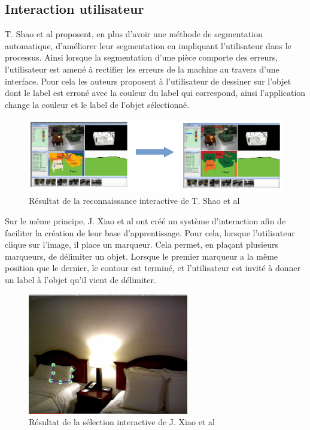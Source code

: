 \subsection{Interaction utilisateur}
T. Shao et al\cite{interactiveSeg} proposent, en plus d'avoir une méthode de segmentation automatique, d'améliorer leur 
segmentation en impliquant l'utilisateur dans le processus. Ainsi lorsque la segmentation d'une pièce comporte des erreurs, 
l'utilisateur est amené à rectifier les erreurs de la machine au travers d'une interface.
Pour cela les auteurs proposent à l'utilisateur de dessiner sur l'objet dont le label est erroné avec la couleur du label 
qui correspond, ainsi l'application change la couleur et le label de l'objet sélectionné.\\ 

\begin{figure}[!ht]
  \begin{center}
    \includegraphics[width=15cm]{image/recoInteractive1.png}
    \caption{Résultat de la reconnaissance interactive de T. Shao et al\cite{interactiveSeg}}
  \end{center}
\end{figure}

Sur le même principe, J. Xiao et al\cite{interactionSeg2}
ont créé un système d'interaction afin de faciliter la création de leur base d'apprentissage. Pour cela, lorsque l'utilisateur 
clique sur l'image, il place un marqueur. Cela permet, en plaçant plusieurs marqueurs, de délimiter un objet. Lorsque le premier
marqueur a la même position que le dernier, le contour est terminé, et l'utilisateur est invité à donner un label à l'objet
qu'il vient de délimiter.

\begin{figure}[!ht]
  \begin{center}
    \includegraphics[width=7cm]{image/segInteractive1.png}
    \caption{Résultat de la sélection interactive de J. Xiao et al\cite{interactionSeg2}}
  \end{center}
\end{figure}
